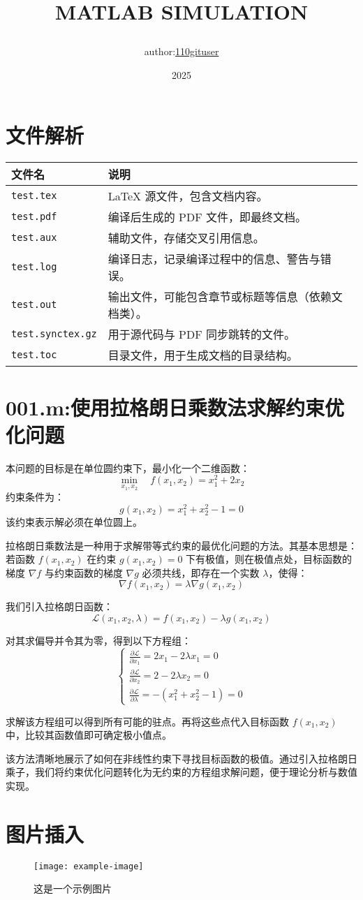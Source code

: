 \documentclass[12pt]{article}
\title{\Huge MATLAB SIMULATION\par \vspace{.1em}}
\author{\large author:\href{https://github.com/110gituser/MATLAB}{110gituser}\\}
\date{2025}
\begin{document}
\maketitle
\cleardoublepage
\tableofcontents
\cleardoublepage

\section{文件解析}
\begin{longtable}{@{}ll@{}}
    \toprule
    \textbf{文件名} & \textbf{说明} \\
    \midrule
    \texttt{test.tex} & LaTeX 源文件，包含文档内容。 \\
    \texttt{test.pdf} & 编译后生成的 PDF 文件，即最终文档。 \\
    \texttt{test.aux} & 辅助文件，存储交叉引用信息。 \\
    \texttt{test.log} & 编译日志，记录编译过程中的信息、警告与错误。 \\
    \texttt{test.out} & 输出文件，可能包含章节或标题等信息（依赖文档类）。 \\
    \texttt{test.synctex.gz} & 用于源代码与 PDF 同步跳转的文件。 \\
    \texttt{test.toc} & 目录文件，用于生成文档的目录结构。 \\
    \bottomrule
\end{longtable}

\section{001.m:使用拉格朗日乘数法求解约束优化问题}

本问题的目标是在单位圆约束下，最小化一个二维函数：
\[
\min_{x_1, x_2} \quad f(x_1, x_2) = x_1^2 + 2x_2
\]
约束条件为：
\[
g(x_1, x_2) = x_1^2 + x_2^2 - 1 = 0
\]
该约束表示解必须在单位圆上。

拉格朗日乘数法是一种用于求解带等式约束的最优化问题的方法。其基本思想是：若函数 \( f(x_1, x_2) \) 在约束 \( g(x_1, x_2) = 0 \) 下有极值，则在极值点处，目标函数的梯度 \( \nabla f \) 与约束函数的梯度 \( \nabla g \) 必须共线，即存在一个实数 \( \lambda \)，使得：
\[
\nabla f(x_1, x_2) = \lambda \nabla g(x_1, x_2)
\]

我们引入拉格朗日函数：
\[
\mathcal{L}(x_1, x_2, \lambda) = f(x_1, x_2) - \lambda g(x_1, x_2)
\]

对其求偏导并令其为零，得到以下方程组：
\[
\begin{cases}
\frac{\partial \mathcal{L}}{\partial x_1} = 2x_1 - 2\lambda x_1 = 0 \\
\frac{\partial \mathcal{L}}{\partial x_2} = 2 - 2\lambda x_2 = 0 \\
\frac{\partial \mathcal{L}}{\partial \lambda} = - (x_1^2 + x_2^2 - 1) = 0
\end{cases}
\]

求解该方程组可以得到所有可能的驻点。再将这些点代入目标函数 \( f(x_1, x_2) \) 中，比较其函数值即可确定极小值点。

该方法清晰地展示了如何在非线性约束下寻找目标函数的极值。通过引入拉格朗日乘子，我们将约束优化问题转化为无约束的方程组求解问题，便于理论分析与数值实现。

\section{图片插入}
\begin{figure}[h]
    \centering
    \texttt{[image: example-image]}
    \caption{这是一个示例图片}
\end{figure}
\end{document}
